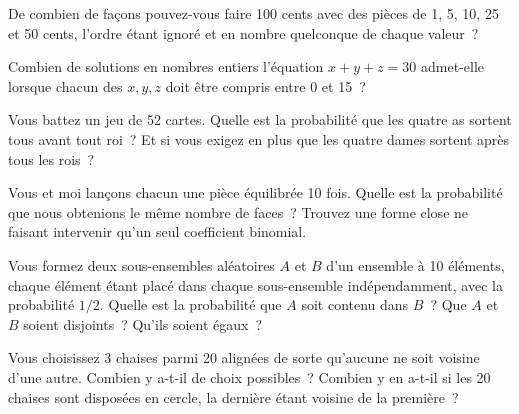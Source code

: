\begin{question}\label{iq:iv1:counting-and-symmetry:22}
De combien de façons pouvez-vous faire 100 cents avec des pièces de 1, 5, 10, 25 et 50 cents, l'ordre étant ignoré et en nombre quelconque de chaque valeur~?
\end{question}

\begin{question}\label{iq:iv1:counting-and-symmetry:23}
Combien de solutions en nombres entiers l'équation $x + y + z = 30$ admet-elle lorsque chacun des $x, y, z$ doit être compris entre 0 et 15~?
\end{question}

\begin{question}\label{iq:iv1:counting-and-symmetry:24}
Vous battez un jeu de 52 cartes. Quelle est la probabilité que les quatre as sortent tous avant tout roi~? Et si vous exigez en plus que les quatre dames sortent après tous les rois~?
\end{question}

\begin{question}\label{iq:iv1:counting-and-symmetry:25}
Vous et moi lançons chacun une pièce équilibrée 10 fois. Quelle est la probabilité que nous obtenions le même nombre de faces~? Trouvez une forme close ne faisant intervenir qu'un seul coefficient binomial.
\end{question}

\begin{question}\label{iq:iv1:counting-and-symmetry:26}
Vous formez deux sous-ensembles aléatoires $A$ et $B$ d'un ensemble à 10 éléments, chaque élément étant placé dans chaque sous-ensemble indépendamment, avec la probabilité $1/2$. Quelle est la probabilité que $A$ soit contenu dans $B$~? Que $A$ et $B$ soient disjoints~? Qu'ils soient égaux~?
\end{question}

\begin{question}\label{iq:iv1:counting-and-symmetry:27}
Vous choisissez 3 chaises parmi 20 alignées de sorte qu'aucune ne soit voisine d'une autre. Combien y a-t-il de choix possibles~? Combien y en a-t-il si les 20 chaises sont disposées en cercle, la dernière étant voisine de la première~?
\end{question}

